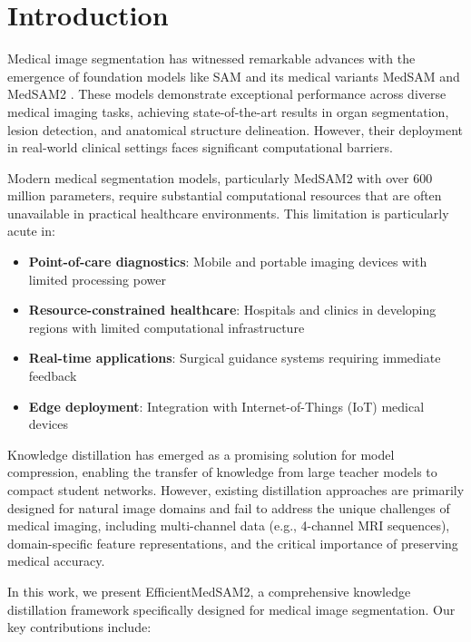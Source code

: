 \documentclass[conference]{IEEEtran}
\begin{document}
\section{Introduction}

Medical image segmentation has witnessed remarkable advances with the emergence of foundation models like SAM \cite{kirillov2023segment} and its medical variants MedSAM \cite{ma2024medsam} and MedSAM2 \cite{cheng2024medsam2}. These models demonstrate exceptional performance across diverse medical imaging tasks, achieving state-of-the-art results in organ segmentation, lesion detection, and anatomical structure delineation. However, their deployment in real-world clinical settings faces significant computational barriers.

Modern medical segmentation models, particularly MedSAM2 with over 600 million parameters, require substantial computational resources that are often unavailable in practical healthcare environments. This limitation is particularly acute in:

\begin{itemize}
    \item \textbf{Point-of-care diagnostics}: Mobile and portable imaging devices with limited processing power
    \item \textbf{Resource-constrained healthcare}: Hospitals and clinics in developing regions with limited computational infrastructure  
    \item \textbf{Real-time applications}: Surgical guidance systems requiring immediate feedback
    \item \textbf{Edge deployment}: Integration with Internet-of-Things (IoT) medical devices
\end{itemize}

Knowledge distillation \cite{hinton2015distilling} has emerged as a promising solution for model compression, enabling the transfer of knowledge from large teacher models to compact student networks. However, existing distillation approaches are primarily designed for natural image domains and fail to address the unique challenges of medical imaging, including multi-channel data (e.g., 4-channel MRI sequences), domain-specific feature representations, and the critical importance of preserving medical accuracy.

In this work, we present EfficientMedSAM2, a comprehensive knowledge distillation framework specifically designed for medical image segmentation. Our key contributions include:
\end{document}

